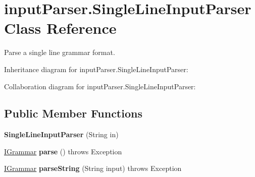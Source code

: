\hypertarget{classinput_parser_1_1_single_line_input_parser}{\section{input\-Parser.\-Single\-Line\-Input\-Parser Class Reference}
\label{classinput_parser_1_1_single_line_input_parser}
}


Parse a single line grammar format.  




Inheritance diagram for input\-Parser.\-Single\-Line\-Input\-Parser\-:


Collaboration diagram for input\-Parser.\-Single\-Line\-Input\-Parser\-:
\subsection*{Public Member Functions}
\begin{DoxyCompactItemize}
\item 
\hypertarget{classinput_parser_1_1_single_line_input_parser_a3efb0396347ec7ed7376dbd37eb4d28c}{{\bfseries Single\-Line\-Input\-Parser} (String in)}\label{classinput_parser_1_1_single_line_input_parser_a3efb0396347ec7ed7376dbd37eb4d28c}

\item 
\hypertarget{classinput_parser_1_1_single_line_input_parser_ad822676b0d3182a591e2004c3bcc79d5}{\hyperlink{interfacecontext_free_1_1grammar_1_1_i_grammar}{I\-Grammar} {\bfseries parse} ()  throws Exception }\label{classinput_parser_1_1_single_line_input_parser_ad822676b0d3182a591e2004c3bcc79d5}

\item 
\hypertarget{classinput_parser_1_1_single_line_input_parser_a90641140f8686fc97fd40b72beccf0a3}{\hyperlink{interfacecontext_free_1_1grammar_1_1_i_grammar}{I\-Grammar} {\bfseries parse\-String} (String input)  throws Exception }\label{classinput_parser_1_1_single_line_input_parser_a90641140f8686fc97fd40b72beccf0a3}

\end{DoxyCompactItemize}
